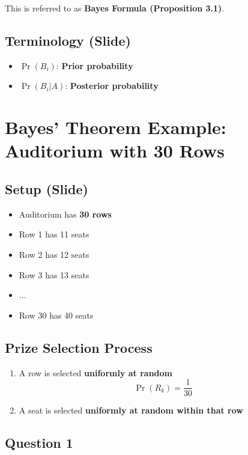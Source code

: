 \documentclass[11pt]{article}
\begin{document}
This is referred to as \textbf{Bayes Formula (Proposition 3.1)}.

\subsection*{Terminology (Slide)}

\begin{itemize}
    \item \( \Pr(B_i) \): \textbf{Prior probability}
    \item \( \Pr(B_i|A) \): \textbf{Posterior probability}
\end{itemize}

\vspace{1em}

\section{Bayes’ Theorem Example: Auditorium with 30 Rows}

\subsection*{Setup (Slide)}

\begin{itemize}
    \item Auditorium has \textbf{30 rows}
    \item Row 1 has 11 seats
    \item Row 2 has 12 seats
    \item Row 3 has 13 seats
    \item \(\ldots\)
    \item Row 30 has 40 seats
\end{itemize}

\subsection*{Prize Selection Process}

\begin{enumerate}
    \item A row is selected \textbf{uniformly at random}
    \[
    \Pr(R_k) = \frac{1}{30}
    \]
    \item A seat is selected \textbf{uniformly at random within that row}
\end{enumerate}

\subsection*{Question 1}
\end{document}
